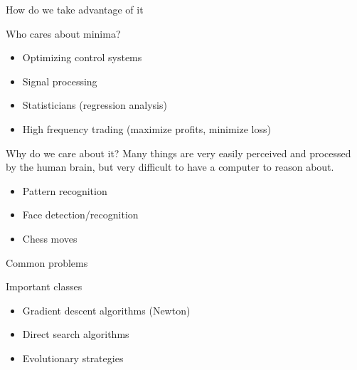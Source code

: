 \documentclass[11pt,a4paper]{beamer}
\begin{document}
\begin{frame}{How do we take advantage of it}
\begin{block}{Who cares about minima?} \pause
\begin{itemize}
\item Optimizing control systems \pause
\item Signal processing \pause
\item Statisticians (regression analysis) \pause
\item High frequency trading (maximize profits, minimize loss) \pause
\end{itemize}
\end{block}
\begin{block}{Why do we care about it?}
Many things are very easily perceived and processed by the human brain, but very difficult to have a computer to reason about. \pause
\begin{itemize}
\item Pattern recognition \pause
\item Face detection/recognition \pause
\item Chess moves 
\end{itemize}
\end{block}

\end{frame}


\begin{frame}{Common problems}
\begin{block}{Important classes}
\begin{itemize}
\item Gradient descent algorithms (Newton)
\item Direct search algorithms
\item Evolutionary strategies
\end{itemize}
\end{block}


\end{frame}
\end{document}
